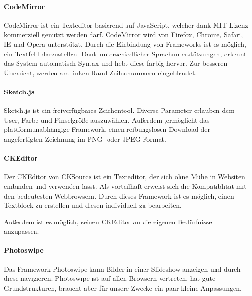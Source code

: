 \paragraph{CodeMirror}
CodeMirror ist ein Texteditor basierend auf JavaScript, welcher dank MIT Lizenz kommerziell genutzt werden darf. CodeMirror wird von Firefox, Chrome, Safari, IE und Opera unterstützt. Durch die Einbindung von Frameworks ist es möglich, ein Textfeld darzustellen. Dank unterschiedlicher Sprachunterstützungen, erkennt das System automatisch Syntax und hebt diese farbig hervor. Zur besseren Übersicht, werden am linken Rand Zeilennummern eingeblendet. \cite{CODEMIRROR}


\paragraph{Sketch.js}
Sketch.js ist ein freiverfügbares Zeichentool. Diverse Parameter erlauben dem User, Farbe und Pinselgröße auszuwählen. Außerdem ,ermöglicht das plattformunabhängige Framework, einen reibungslosen Download der angefertigten Zeichnung im PNG- oder JPEG-Format. \cite{SKETCH}


\paragraph{CKEditor}
Der CKEditor von CKSource ist ein Texteditor, der sich ohne Mühe in Websiten einbinden und verwenden lässt. Als vorteilhaft erweist sich die Kompatiblität mit den bedeutesten Webbrowsern. Durch dieses Framework ist es möglich, einen Textblock zu erstellen und diesen individuell zu bearbeiten.

Außerdem ist es möglich, seinen CKEditor an die eigenen Bedürfnisse anzupassen.\cite{CKEDITOR}


\paragraph{Photoswipe}
Das Framework Photoswipe kann Bilder in einer Slideshow anzeigen und durch diese navigieren. Photoswipe ist auf allen Browsern vertreten, hat gute Grundstrukturen, braucht aber für unsere Zwecke ein paar kleine Anpassungen. \cite{PHOTOSWIPE}


